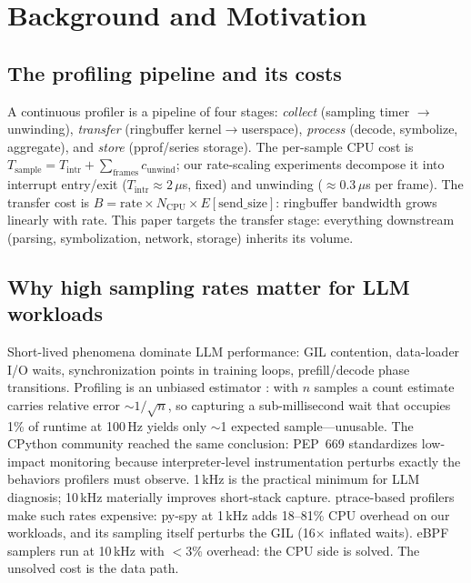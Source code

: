 \documentclass[letterpaper,twocolumn,10pt]{article}
\begin{document}
\section{Background and Motivation}
\label{sec:motive}

\subsection{The profiling pipeline and its costs}
A continuous profiler is a pipeline of four stages: \emph{collect}
(sampling timer $\rightarrow$ unwinding), \emph{transfer} (ringbuffer
kernel$\rightarrow$userspace), \emph{process} (decode, symbolize,
aggregate), and \emph{store} (pprof/series storage). The per-sample CPU
cost is $T_\text{sample} = T_\text{intr} + \sum_\text{frames}
c_\text{unwind}$; our rate-scaling experiments decompose it into interrupt
entry/exit ($T_\text{intr} \approx 2\,\mu$s, fixed) and unwinding
($\approx$0.3\,$\mu$s per frame). The transfer cost is
$B = \text{rate} \times N_\text{CPU} \times E[\text{send\_size}]$: ringbuffer
bandwidth grows linearly with rate. This paper targets the transfer stage:
everything downstream (parsing, symbolization, network, storage) inherits
its volume.

\subsection{Why high sampling rates matter for LLM workloads}
Short-lived phenomena dominate LLM performance: GIL contention, data-loader
I/O waits, synchronization points in training loops, prefill/decode phase
transitions. Profiling is an unbiased estimator \cite{jain}: with $n$
samples a count
estimate carries relative error $\sim 1/\sqrt{n}$, so capturing a
sub-millisecond wait that occupies 1\% of runtime at 100\,Hz yields only
$\sim$1 expected sample---unusable. The CPython community reached the same
conclusion: PEP~669 \cite{pep669} standardizes low-impact monitoring
because interpreter-level instrumentation perturbs exactly the behaviors
profilers must observe. 1\,kHz is the practical minimum for
LLM diagnosis; 10\,kHz materially improves short-stack capture. ptrace-based
profilers make such rates expensive: py-spy at 1\,kHz adds 18--81\% CPU
overhead on our workloads, and its sampling itself perturbs the GIL
(16$\times$ inflated waits). eBPF samplers run at 10\,kHz with $<$3\%
overhead: the CPU side is solved. The unsolved cost is the data path.
\end{document}
